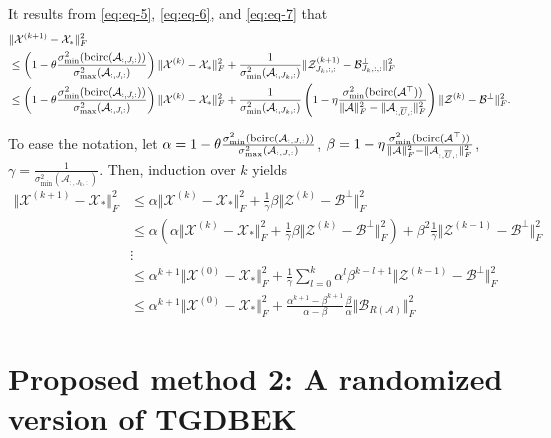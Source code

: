 \documentclass[aspectratio=169]{beamer}
\def\bcirc{{\rm bcirc}}
\def\fm#1{\mathcal{#1}}
\def\fm#1{\mathcal{#1}}
\def \a#1{\fm A_{:, #1, :}}
\def \z#1#2{\fm Z^{(#1)}_{#2, :, :}}
\def \bp#1{\fm B^{\perp}_{#1, :, :}}
\def \x#1{\fm X^{(#1)}}
\begin{document}
\begin{frame}{}
\scriptsize
It results from  \eqref{eq:eq-5}, \eqref{eq:eq-6}, and \eqref{eq:eq-7} that
\begin{align*}
 & \Vert \x{k+1} - \fm X_\ast \Vert_F^2 \\
 &  \leq \left( 1 - \theta \frac{\sigma_{\min}^2(\bcirc(\a{J}))}{\sigma^2_{\max}(\a{J})}\right) \Vert \x k - \fm X_\ast \Vert_F^2 +  \frac{1}{\sigma_{\min}^2(\a{J_k})} \Vert  \z{k+1}{J_k} - \bp{J_k} \Vert_F^2\\
 & \leq \left( 1 - \theta \frac{\sigma_{\min}^2(\bcirc(\a{J}))}{\sigma^2_{\max}(\a{J})}\right) \Vert \x k - \fm X_\ast \Vert_F^2 + \frac{1}{\sigma_{\min}^2(\a{J_k})} \left( 1 - \eta  \frac{\sigma_{\min}^2(\bcirc(\fm A^\top))}{\Vert \fm A \Vert_F^2 - \Vert \a{\overline{U}} \Vert_F^2}   \right) \Vert  \fm Z^{(k)} - \fm B^\perp \Vert_F^2 .
\end{align*}
    
\end{frame}
\begin{frame}{}
To ease the notation, let $\alpha =  1 - \theta \frac{\sigma_{\min}^2(\bcirc(\a{J}))}{\sigma^2_{\max}(\a{J})}$, $\beta = 1 - \eta  \frac{\sigma_{\min}^2(\bcirc(\fm A^\top))}{\Vert \fm A \Vert_F^2 - \Vert \a{\overline{U}} \Vert_F^2}  $, \; $\gamma =\frac{1}{\sigma_{\min}^2(\a{J_k})}$. Then, induction over $k$ yields
\begin{align*}
    \Vert \x{k+1} - \fm X_\ast \Vert_F^2  & \leq \alpha  \Vert \x k - \fm X_\ast \Vert_F^2 + \frac{1}{\gamma}\beta \Vert \fm Z^{(k)} - \fm B^\perp \Vert_F^2\\
    & \leq \alpha \left( \alpha  \Vert \x k - \fm X_\ast \Vert_F^2 + \frac{1}{\gamma}\beta \Vert \fm Z^{(k)} - \fm B^\perp \Vert_F^2 \right) + \beta^2 \frac{1}{\gamma} \Vert \fm Z^{(k-1)} - \fm B^\perp \Vert_F^2\\
    &\vdots\\
    & \leq \alpha^{k+1} \Vert \x 0 - \fm X_\ast \Vert_F^2  + \frac{1}{\gamma}\sum_{l=0}^k \alpha^{l} \beta^{k-l+1}  \Vert \fm Z^{(k-1)} - \fm B^\perp \Vert_F^2\\
    &\leq \alpha^{k+1} \Vert \x 0 - \fm X_\ast \Vert_F^2 + \frac{\alpha^{k+1} -\beta^{k+1}}{\alpha - \beta} \frac{\beta}{\alpha}\Vert \fm B_{R(\fm A)}\Vert_F^2
\end{align*}


\end{frame}
\section{Proposed method  2: A randomized version of TGDBEK}
\end{document}
